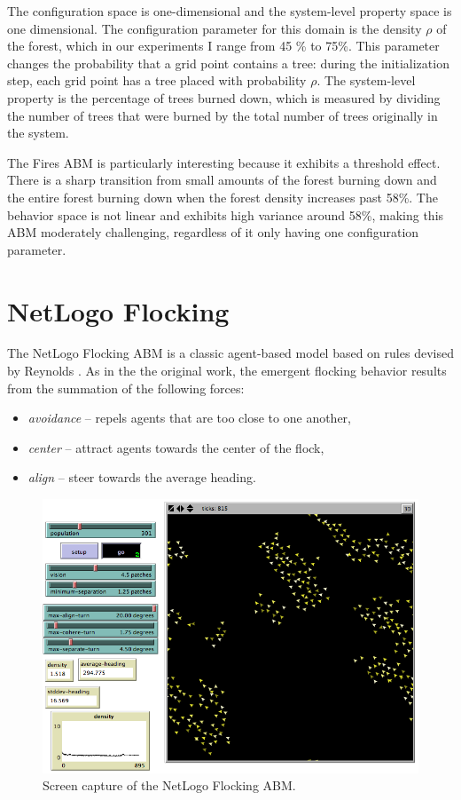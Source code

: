 The configuration space is one-dimensional and the system-level property space is one dimensional.
The configuration parameter for this domain is the density $\rho$ of the forest, which in our experiments I range from 45 \% to 75\%.
This parameter changes the probability that a grid point contains a tree:
during the initialization step, each grid point has a tree placed with probability $\rho$.
The system-level property is the percentage of trees burned down, which is measured by dividing the number of trees that were burned by the total number of trees originally in the system.


The Fires ABM is particularly interesting because it exhibits a threshold effect.
There is a sharp transition from small amounts of the forest burning down and the entire forest burning down when the forest density increases past 58\%.
The behavior space is not linear and exhibits high variance around 58\%, making this ABM moderately challenging, regardless of it only having one configuration parameter.


 \section{NetLogo Flocking}

The NetLogo Flocking ABM is a classic agent-based model based on rules devised by Reynolds \cite{reynolds1987}.
As in the the original work, the emergent flocking behavior results from the summation of the following forces:
\begin{itemize}
	\item \textit{avoidance} -- repels agents that are too close to one another,
	\item \textit{center} -- attract agents towards the center of the flock,
	\item \textit{align} -- steer towards the average heading.
\end{itemize}

\begin{figure}[ht]
\centering
\includegraphics[scale=.5]{images/flocking_ss.png}
\caption{Screen capture of the NetLogo Flocking ABM.}
\label{fig:flockingss}
\end{figure}

